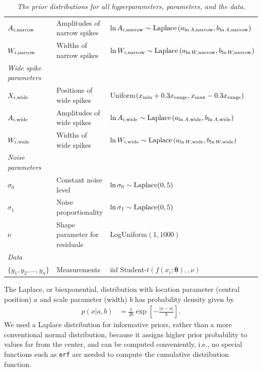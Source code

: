 \documentclass[a4paper, 12pt]{article}
\newcommand{\params}{\boldsymbol{\theta}}
\begin{document}
\begin{landscape}
\begin{table}
\begin{tabular}{|lll|}
$A_{i, \rm narrow}$ & Amplitudes of narrow spikes &
 $\ln A_{i, \rm narrow} \sim \textnormal{Laplace}\left(a_{\ln A, \rm narrow}, b_{\ln A, \rm narrow}\right)$ \\
$W_{i, \rm narrow}$ & Widths of narrow spikes &
 $\ln W_{i, \rm narrow} \sim \textnormal{Laplace}\left(a_{\ln W, \rm narrow}, b_{\ln W, \rm narrow}\right)$ \\
\hline
{\em Wide spike parameters}&&\\
$X_{i, \rm wide}$ & Positions of wide spikes &
          Uniform$(x_{\rm min}+0.3x_{\rm range}, x_{\rm max}-0.3x_{\rm range})$ \\
$A_{i, \rm wide}$ & Amplitudes of wide spikes &
 $\ln A_{i, \rm wide} \sim \textnormal{Laplace}\left(a_{\ln A, \rm wide}, b_{\ln A, \rm wide}\right)$ \\
$W_{i, \rm wide}$ & Widths of wide spikes &
 $\ln W_{i, \rm wide} \sim \textnormal{Laplace}\left(a_{\ln W, \rm wide}, b_{\ln W, \rm wide}\right)$ \\
\hline
{\em Noise parameters}&&\\
$\sigma_0$ &    Constant noise level  &   $\ln \sigma_0 \sim \textnormal{Laplace}(0,5)$\\
$\sigma_1$ &    Noise proportionality   &  $\ln \sigma_1 \sim \textnormal{Laplace}(0,5)$ \\
$\nu$     &   Shape parameter for residuals   &   LogUniform$(1, 1000)$\\
\hline
{\em Data}&&\\
\hline
$\{y_1, y_2, ..., y_n\}$  &   Measurements    & iid Student-$t(f(x_i; \params), ,\nu)$\\
\hline
\end{tabular}
\caption{\it The prior distributions for all hyperparameters,
parameters, and the data.\label{tab:priors}}
\end{table}

\end{landscape}

The Laplace, or biexponential, distribution with location parameter
(central position) $a$ and scale parameter (width) $b$ has probability
density given by
\begin{align}
p(x | a, b) &= \frac{1}{2b}\exp\left[-\frac{|x - a|}{b}\right].
\end{align}
We used a Laplace distribution for informative priors, rather than
a more conventional normal distribution, because it assigns higher
prior probability to values far from the center, and can be computed conveniently, i.e., no special functions such as {\tt erf} are needed
to compute the cumulative distribution function.
\end{document}

